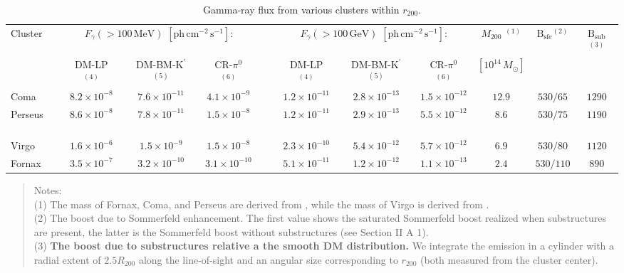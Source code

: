 \documentclass[10pt,aps,pra,reprint,amsmath,amsfonts,amssymb,showpacs,nofootinbib,floatfix]{revtex4-1}
\def\C#1{{\bf #1}}
\newcommand{\rmn}{\mathrm}
\newcommand{\msun}{M_\odot}
\newcommand{\Kp}{\rmn{K}^\prime}
\newcommand{\B}{\rmn{B}}
\newcommand{\rvir}{r_{200}}
\newcommand{\mvir}{M_{200}}
\begin{document}
\begin{table}
\begin{minipage}{2.0\columnwidth}
  \caption{Gamma-ray flux from various clusters within $\rvir$.}
\begin{tabular}{l c c c c c c c c c c}
\hline
\hline
 Cluster &
\multicolumn{3}{c}{$F_{\gamma}(>100\,\rmn{MeV})$ $[\rmn{ph}\,\rmn{cm}^{-2}\,\rmn{s}^{-1}]$:} & &
\multicolumn{3}{c}{$F_{\gamma}(>100\,\rmn{GeV})$ $[\rmn{ph}\,\rmn{cm}^{-2}\,\rmn{s}^{-1}]$:} &
$\mvir$ $^{(1)}$ & $\B_\rmn{sfe} $$^{(2)}$ & $\B_\rmn{sub} $$^{(3)}$ \\
         & DM-LP $^{(4)}$ & DM-BM-$\Kp$ $^{(5)}$ & CR-$\pi^0$ $^{(6)}$
         & & DM-LP $^{(4)}$ & DM-BM-$\Kp$ $^{(5)}$ & CR-$\pi^0$ $^{(6)}$ & $[10^{14}\,\msun]$ && \\
 \hline
 Coma & $8.2\times10^{-8}$ & $7.6\times10^{-11}$ & $4.1\times10^{-9}$
 & \,\,\,\,\, & $1.2\times10^{-11}$ & $2.8\times10^{-13}$ & $1.5\times10^{-12}$
 & $12.9$ & $530/65$ & $1290$ \\
 Perseus \,\,\,\,\,\, & $8.6\times10^{-8}$ & $7.8\times10^{-11}$ & $1.5\times10^{-8}$
 & \,\,\,\,\, & $1.2\times10^{-11}$ & $2.9\times10^{-13}$ & $5.5\times10^{-12}$
 & $8.6$ & $530/75$ & $1190$ \\
 Virgo & $1.6\times10^{-6}$ & $1.5\times10^{-9}$ & $1.5\times10^{-8}$
 & \,\,\,\,\, & $2.3\times10^{-10}$ & $5.4\times10^{-12}$ & $5.7\times10^{-12}$
 & $6.9$ & $530/80$ & $1120$ \\
 Fornax & $3.5\times10^{-7}$ & $3.2\times10^{-10}$ & $3.1\times10^{-10}$
 & \,\,\,\,\, & $5.1\times10^{-11}$ & $1.2\times10^{-12}$ & $1.1\times10^{-13}$
 & $2.4$ & $530/110$ & $890$ \\
\hline
\hline
\end{tabular}
\begin{quote}
  Notes: \\
  (1) The mass of Fornax, Coma, and Perseus are derived from \cite{2007A&A...466..805C},
  while the mass of Virgo is derived from \cite{1984ApJ...281...31T}.\\
  (2) The boost due to Sommerfeld enhancement. The first value shows the saturated
  Sommerfeld boost realized when substructures are present, the latter is the Sommerfeld
  boost without substructures (see Section II A 1).\\
  (3) \C{The boost due to substructures relative a the smooth DM
  distribution.} We integrate the emission in a cylinder with a radial
  extent of $2.5 R_{200}$ along the line-of-sight and an angular size
  corresponding to $\rvir$ (both measured from the cluster center).\\

\end{quote}
\end{minipage}
\end{table}
\end{document}
